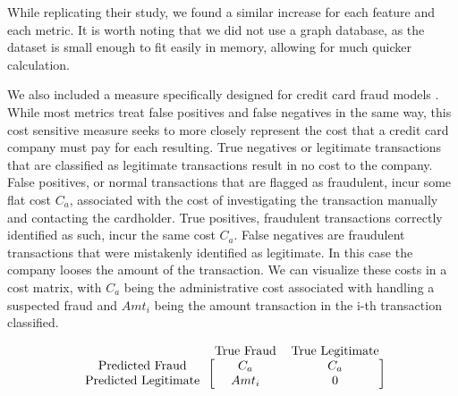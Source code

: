 \documentclass{article}
\begin{document}
While replicating their study, we found a similar increase for each feature and each metric. It is worth noting that we did not use a graph database, as the dataset is small enough to fit easily in memory, allowing for much quicker calculation. 

We also included a measure specifically designed for credit card fraud models \cite{New_metric}. While most metrics treat false positives and false negatives in the same way, this cost sensitive measure seeks to more closely represent the cost that a credit card company must pay for each resulting. True negatives or legitimate transactions that are classified as legitimate transactions result in no cost to the company. False positives, or normal transactions that are flagged as fraudulent, incur some flat cost $C_a$, associated with the cost of investigating the transaction manually and contacting the cardholder. True positives, fraudulent transactions correctly identified as such, incur the same cost $C_a$. False negatives are fraudulent transactions that were mistakenly identified as legitimate. In this case the company looses the amount of the transaction. We can visualize these costs in a cost matrix, with $C_a$ being the administrative cost associated with handling a suspected fraud and $Amt_i$ being the amount transaction in the i-th transaction classified. 

\[
\begin{blockarray}{ccc}
& \text{True Fraud} & \text{True Legitimate} \\
\begin{block}{c[cc]}
  \text{Predicted Fraud} & C_a & C_a\\
  \text {Predicted Legitimate} & Amt_i & 0 \\
\end{block}
\end{blockarray}
\]




\end{document}
